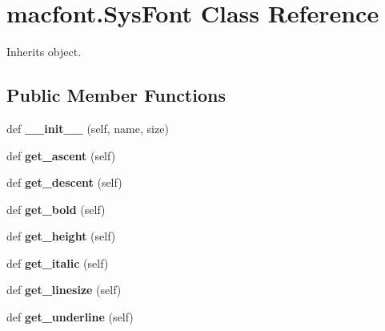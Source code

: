\hypertarget{classmacfont_1_1_sys_font}{}\section{macfont.\+Sys\+Font Class Reference}
\label{classmacfont_1_1_sys_font}


Inherits object.

\subsection*{Public Member Functions}
\begin{DoxyCompactItemize}
\item 
\mbox{\label{classmacfont_1_1_sys_font_a6af3439cbddc4f82b1077fbf89cdc5c1}} 
def {\bfseries \+\_\+\+\_\+init\+\_\+\+\_\+} (self, name, size)
\item 
\mbox{\label{classmacfont_1_1_sys_font_a42c2c352e77511e803dde488b879d4d0}} 
def {\bfseries get\+\_\+ascent} (self)
\item 
\mbox{\label{classmacfont_1_1_sys_font_a4e8dc8a54f4bcc80be25bc01b8a15a15}} 
def {\bfseries get\+\_\+descent} (self)
\item 
\mbox{\label{classmacfont_1_1_sys_font_ad991032e280f92666e17e701548976d1}} 
def {\bfseries get\+\_\+bold} (self)
\item 
\mbox{\label{classmacfont_1_1_sys_font_a40e217db1613eae110a906e24d23cc4d}} 
def {\bfseries get\+\_\+height} (self)
\item 
\mbox{\label{classmacfont_1_1_sys_font_ad8bf023a8668d8dc9a532e65930746ba}} 
def {\bfseries get\+\_\+italic} (self)
\item 
\mbox{\label{classmacfont_1_1_sys_font_afaf5a0b82b7ecd2bbb8ee4ed10b11d83}} 
def {\bfseries get\+\_\+linesize} (self)
\item 
\mbox{\label{classmacfont_1_1_sys_font_ab00d8b783fe16bc39d230e7820f3ded8}} 
def {\bfseries get\+\_\+underline} (self)

\end{DoxyCompactItemize}
